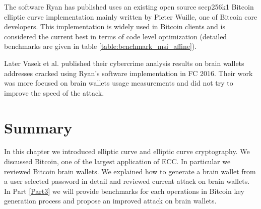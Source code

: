 The software Ryan has published uses an existing open source secp256k1 Bitcoin elliptic curve implementation mainly written by Pieter Wuille, one of Bitcoin core developers. This implementation is widely used in Bitcoin clients and is considered the current best in terms of code level optimization (detailed benchmarks are given in  table \ref{table:benchmark_msi_affine}).

Later Vasek et al. published their cybercrime analysis results on brain wallets addresses cracked using Ryan's software implementation in FC 2016. Their work was more focused on brain wallets usage measurements and did not try to improve the speed of the attack.

\section{Summary}
In this chapter we introduced elliptic curve and elliptic curve cryptography. We discussed Bitcoin, one of the largest application of ECC. In particular we reviewed Bitcoin brain wallets. We explained how to generate a brain wallet from a user selected password in detail and reviewed current attack on brain wallets. In Part \ref{Part3} we will provide benchmarks for each operations in Bitcoin key generation process and propose an improved attack on brain wallets.
